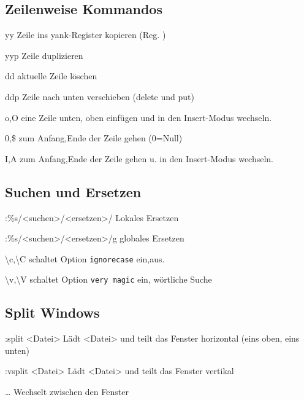 \documentclass{scrartcl}
\begin{document}
\begin{multicols}{2}
\subsection*{Zeilenweise Kommandos}

\begin{description*}

	\item[yy] Zeile ins yank-Register kopieren (Reg. \dq)
	\item[yyp] Zeile duplizieren
	\item[dd] aktuelle Zeile löschen
	\item[ddp] Zeile nach unten verschieben (delete und put)
	\item[o,O] eine Zeile unten, oben einfügen und in den Insert-Modus wechseln.
	\item[0,\$] zum Anfang,Ende der Zeile gehen (0=Null)
	\item[I,A] zum Anfang,Ende der Zeile gehen u. in den Insert-Modus wechseln.

\end{description*}

\subsection*{Suchen und Ersetzen}

\begin{description*}

  \item[:\%s/<suchen>/<ersetzen>/] Lokales Ersetzen
  \item[:\%s/<suchen>/<ersetzen>/g] globales Ersetzen
  \item[\textbackslash c,\textbackslash C] schaltet Option \texttt{ignorecase} ein,aus. 
  \item[\textbackslash v,\textbackslash V] schaltet Option \texttt{very magic} ein, wörtliche Suche


\end{description*}


\subsection*{Split Windows}

\begin{description*}

  \item[:split <Datei>] Lädt <Datei> und teilt das Fenster horizontal (eins oben, eins unten)
  \item[:vsplit <Datei>] Lädt <Datei> und teilt das Fenster vertikal
  \item[\ldots] Wechselt zwischen den Fenster


\end{description*}
\end{multicols}
\end{document}
